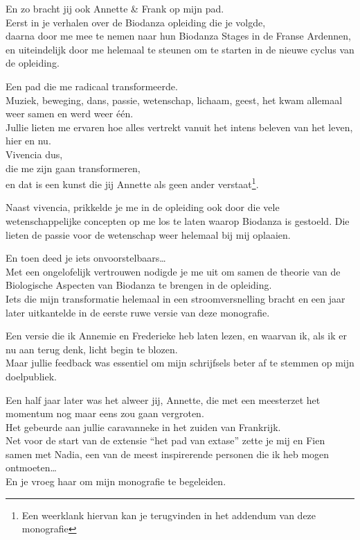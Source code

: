 \documentclass[
  11pt,
]{book}
\begin{document}
En zo bracht jij ook Annette \& Frank op mijn pad.\\
Eerst in je verhalen over de Biodanza opleiding die je volgde,\\
daarna door me mee te nemen naar hun Biodanza Stages in de Franse Ardennen,\\
en uiteindelijk door me helemaal te steunen om te starten in de nieuwe cyclus van de opleiding.

Een pad die me radicaal transformeerde.\\
Muziek, beweging, dans, passie, wetenschap, lichaam, geest,
het kwam allemaal weer samen en werd weer één.\\
Jullie lieten me ervaren hoe alles vertrekt vanuit het intens beleven van het leven, hier en nu.\\
Vivencia dus,\\
die me zijn gaan transformeren,\\
en dat is een kunst die jij Annette als geen ander verstaat\footnote{Een weerklank hiervan kan je terugvinden in het addendum van deze monografie}.

Naast vivencia, prikkelde je me in de opleiding ook door die vele wetenschappelijke concepten op me los te laten waarop Biodanza is gestoeld.
Die lieten de passie voor de wetenschap weer helemaal bij mij oplaaien.

En toen deed je iets onvoorstelbaars\ldots{}\\
Met een ongelofelijk vertrouwen
nodigde je me uit om samen de theorie van de Biologische Aspecten van Biodanza te brengen in de opleiding.\\
Iets die mijn transformatie helemaal in een stroomversnelling bracht en een jaar later uitkantelde in de eerste ruwe versie van deze monografie.

Een versie die ik Annemie en Frederieke heb laten lezen,
en waarvan ik, als ik er nu aan terug denk, licht begin te blozen.\\
Maar jullie feedback was essentiel om mijn schrijfsels beter af te stemmen op mijn doelpubliek.

Een half jaar later was het alweer jij, Annette,
die met een meesterzet het momentum nog maar eens zou gaan vergroten.\\
Het gebeurde aan jullie caravanneke
in het zuiden van Frankrijk.\\
Net voor de start van de extensie ``het pad van extase'' zette je mij en Fien samen met Nadia, een van de meest inspirerende personen die ik heb mogen ontmoeten\ldots{}\\
En je vroeg haar om mijn monografie te begeleiden.
\end{document}
